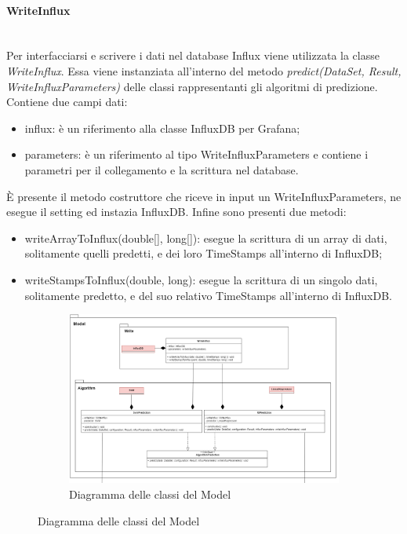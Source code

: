 \paragraph*{WriteInflux} \mbox{}\\ [1mm]
Per interfacciarsi e scrivere i dati nel database Influx viene utilizzata la classe \textit{WriteInflux}. Essa viene instanziata all'interno del metodo \textit{predict(DataSet, Result, WriteInfluxParameters)} delle classi rappresentanti gli algoritmi di predizione. Contiene due campi dati:
\begin{itemize}
	\item influx: è un riferimento alla classe InfluxDB per Grafana\glo;
	\item parameters: è un riferimento al tipo WriteInfluxParameters e contiene i parametri per il collegamento e la scrittura nel database.
\end{itemize}
È presente il metodo costruttore che riceve in input un WriteInfluxParameters, ne esegue il setting ed instazia InfluxDB.
Infine sono presenti due metodi:
\begin{itemize}
	\item writeArrayToInflux(double[], long[]): esegue la scrittura di un array di dati, solitamente quelli predetti, e dei loro TimeStamps all'interno di InfluxDB;
	\item writeStampsToInflux(double, long): esegue la scrittura di un singolo dati, solitamente predetto, e del suo relativo TimeStamps all'interno di InfluxDB.
\end{itemize}
\mbox{}
\begin{landscape}
	\begin{figure}
		\begin{figure} [H]
			\includegraphics[width=\linewidth]{./img/Diagrammi/model-plug-in.png}
			\caption{Diagramma delle classi del Model}
		\end{figure}
	\end{figure}
\end{landscape}


